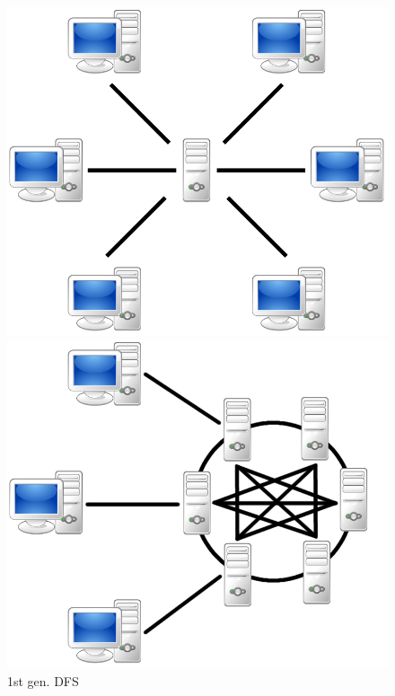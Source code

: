 \begin{figure}
	\centering
	\begin{minipage}{.33\textwidth}
		\centering
		\includegraphics[scale=0.175]{Talk5/1st_gen_dfs.PNG}
		\caption[myfakelabel]{1st gen. DFS\footnotemark[1]{}}
		\label{1st_gen_dfs}
	\end{minipage}%
	\begin{minipage}{.33\textwidth}
		\centering
		\includegraphics[scale=0.175]{Talk5/2nd_gen_dfs.PNG}

\end{minipage}
\end{figure}
